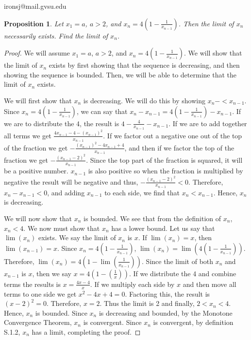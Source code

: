 \documentclass[11 pt]{article}
\newtheorem{proposition}{Proposition}
\newcommand{\newpar}{\vspace{.15in}\noindent}
\begin{document}
\noindent ironsj@mail.gvsu.edu
\newpar
\begin{proposition}
Let $x_1=a$, $a>2$, and $x_n=4(1-\frac{1}{x_{n-1}})$. Then the limit of $x_n$ necessarily exists. Find the limit of $x_n$.
\end{proposition}
\begin{proof}
We will assume $x_1=a$, $a>2$, and $x_n=4(1-\frac{1}{x_{n-1}})$. We will show that the limit of $x_n$ exists by first showing that the sequence is decreasing, and then showing the sequence is bounded. Then, we will be able to determine that the limit of $x_n$ exists.

\newpar
We will first show that $x_n$ is decreasing. We will do this by showing $x_n-<x_{n-1}$. Since $x_n=4(1-\frac{1}{x_{n-1}})$, we can say that $x_n-x_{n-1}=4(1-\frac{1}{x_{n-1}})-x_{n-1}$. If we are to distribute the 4, the result is $4-\frac{4}{x_{n-1}}-x_{n-1}$. If we are to add together all terms we get $\frac{4x_{n-1}-4-(x_{n-1})^2}{x_{n-1}}$. If we factor out a negative one out of the top of the fraction we get $-\frac{(x_{n-1})^2-4x_{n-1}+4}{x_{n-1}}$, and then if we factor the top of the fraction we get $-\frac{(x_{n-1}-2)^2}{x_{n-1}}$. Since the top part of the fraction is squared, it will be a positive number. $x_{n-1}$ is also positive so when the fraction is multiplied by negative the result will be negative and thus, $-\frac{(x_{n-1}-2)^2}{x_{n-1}}<0$. Therefore, $x_n-x_{n-1}<0$, and adding $x_{n-1}$ to each side, we find that $x_n<x_{n-1}$. Hence, $x_n$ is decreasing.

\newpar
We will now show that $x_n$ is bounded. We see that from the definition of $x_n$, $x_n<4$. We now must show that $x_n$ has a lower bound. Let us say that $\lim(x_n)$ exists. We say the limit of $x_n$ is $x$. If $\lim(x_n)=x$, then $\lim(x_{n-1})=x$. Since $x_n=4(1-\frac{1}{x_{n-1}})$, $\lim(x_n)=\lim(4(1-\frac{1}{x_{n-1}}))$. Therefore, $\lim(x_n)= 4(1-\lim(\frac{1}{x_{n-1}}))$. Since the limit of both $x_n$ and $x_{n-1}$ is $x$, then we say $x= 4(1-(\frac{1}{x}))$. If we distribute the 4 and combine terms the results is $x=\frac{4x-4}{x}$. If we multiply each side by $x$ and then move all terms to one side we get $x^2-4x+4=0$. Factoring this, the result is $(x-2)^2=0$. Therefore, $x=2$. Thus the limit is 2 and finally, $2<x_n<4$. Hence, $x_n$ is bounded. Since $x_n$ is decreasing and bounded, by the Monotone Convergence Theorem, $x_n$ is convergent. Since $x_n$ is convergent, by definition S.1.2, $x_n$ has a limit, completing the proof. 



\end{proof}
\end{document}
